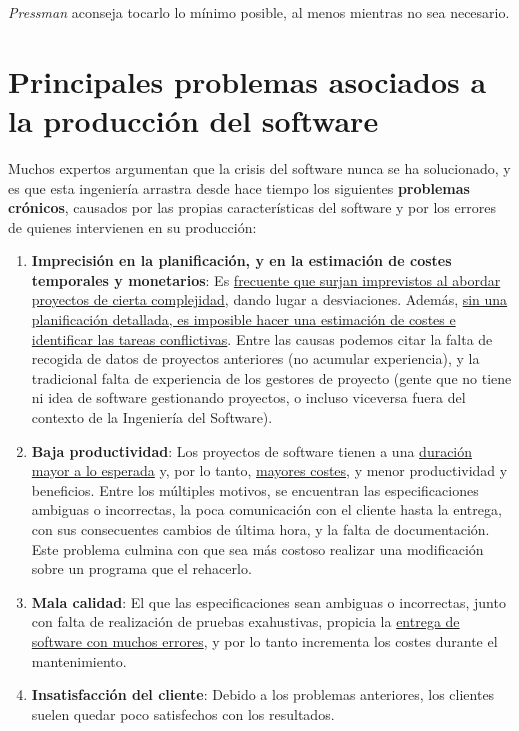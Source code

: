 \textit{Pressman} aconseja tocarlo lo mínimo posible, al menos mientras no sea necesario.

\section{Principales problemas asociados a la producción del software}
Muchos expertos argumentan que la crisis del software nunca se ha solucionado, y es que esta ingeniería arrastra desde hace tiempo los siguientes \textbf{problemas crónicos}, causados por las propias características del software y por los errores de quienes intervienen en su producción:
\begin{enumerate}
    \item \textbf{Imprecisión en la planificación, y en la estimación de costes temporales y monetarios}: Es \uline{frecuente que surjan imprevistos al abordar proyectos de cierta complejidad}, dando lugar a desviaciones. Además, \uline{sin una planificación detallada, es imposible hacer una estimación de costes e identificar las tareas conflictivas}. Entre las causas podemos citar la falta de recogida de datos de proyectos anteriores (no acumular experiencia), y la tradicional falta de experiencia de los gestores de proyecto (gente que no tiene ni idea de software gestionando proyectos, o incluso viceversa fuera del contexto de la Ingeniería del Software).
    \item \textbf{Baja productividad}: Los proyectos de software tienen a una \uline{duración mayor a lo esperada} y, por lo tanto, \uline{mayores costes}, y menor productividad y beneficios. Entre los múltiples motivos, se encuentran las especificaciones ambiguas o incorrectas, la poca comunicación con el cliente hasta la entrega, con sus consecuentes cambios de última hora, y la falta de documentación. Este problema culmina con que sea más costoso realizar una modificación sobre un programa que el rehacerlo.
    \item \textbf{Mala calidad}: El que las especificaciones sean ambiguas o incorrectas, junto con falta de realización de pruebas exahustivas, propicia la \uline{entrega de software con muchos errores}, y por lo tanto incrementa los costes durante el mantenimiento.
    \item \textbf{Insatisfacción del cliente}: Debido a los problemas anteriores, los clientes suelen quedar poco satisfechos con los resultados.
\end{enumerate}